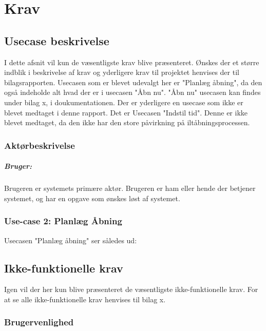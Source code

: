 \documentclass[a4paper, 11pt, oneside]{AuProjectHandin}
\begin{document}
\frontmatter
\tableofcontents
\mainmatter
%	

\chapter{Krav}
\section{Usecase beskrivelse}
I dette afsnit vil kun de væsentligste krav blive præsenteret. Ønskes der et større indblik i beskrivelse af krav og yderligere krav til projektet henvises der til bilagsrapporten. Usecasen som er blevet udevalgt her er "Planlæg åbning", da den også indeholde alt hvad der er i usecasen "Åbn nu". "Åbn nu" usecasen kan findes under bilag x, i doukumentationen. Der er yderligere en usecase som ikke er blevet medtaget i denne rapport. Det er Usecasen "Indstil tid". Denne er ikke blevet medtaget, da den ikke har den store påvirkning på iltåbningsprocessen.

\subsection{Aktørbeskrivelse}

\paragraph{Bruger:} Brugeren er systemets primære aktør. Brugeren er ham eller hende der betjener systemet, og har en opgave som ønskes løst af systemet.

\subsection{Use-case 2: Planlæg Åbning}
Usecasen "Planlæg åbning" ser således ud:

\label{UC2}
\pagebreak


\section{Ikke-funktionelle krav}
Igen vil der her kun blive præsenteret de væsentligste ikke-funktionelle krav. For at se  alle ikke-funktionelle krav henvises til bilag x.
\subsection{Brugervenlighed}
\end{document}
